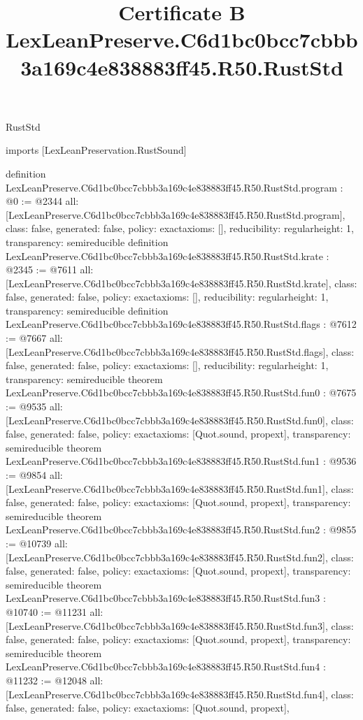 \begin{lexlean}{RustStd}
\title{Certificate B LexLeanPreserve.C6d1bc0bcc7cbbb3a169c4e838883ff45.R50.RustStd}
\begin{coremodule}
imports [LexLeanPreservation.RustSound]

definition LexLeanPreserve.C6d1bc0bcc7cbbb3a169c4e838883ff45.R50.RustStd.program : @0 := @2344 {
  all: [LexLeanPreserve.C6d1bc0bcc7cbbb3a169c4e838883ff45.R50.RustStd.program],
  class: false,
  generated: false,
  policy: exact{axioms: []},
  reducibility: regular{height: 1},
  transparency: semireducible
}
definition LexLeanPreserve.C6d1bc0bcc7cbbb3a169c4e838883ff45.R50.RustStd.krate : @2345 := @7611 {
  all: [LexLeanPreserve.C6d1bc0bcc7cbbb3a169c4e838883ff45.R50.RustStd.krate],
  class: false,
  generated: false,
  policy: exact{axioms: []},
  reducibility: regular{height: 1},
  transparency: semireducible
}
definition LexLeanPreserve.C6d1bc0bcc7cbbb3a169c4e838883ff45.R50.RustStd.flags : @7612 := @7667 {
  all: [LexLeanPreserve.C6d1bc0bcc7cbbb3a169c4e838883ff45.R50.RustStd.flags],
  class: false,
  generated: false,
  policy: exact{axioms: []},
  reducibility: regular{height: 1},
  transparency: semireducible
}
theorem LexLeanPreserve.C6d1bc0bcc7cbbb3a169c4e838883ff45.R50.RustStd.fun0 : @7675 := @9535 {
  all: [LexLeanPreserve.C6d1bc0bcc7cbbb3a169c4e838883ff45.R50.RustStd.fun0],
  class: false,
  generated: false,
  policy: exact{axioms: [Quot.sound, propext]},
  transparency: semireducible
}
theorem LexLeanPreserve.C6d1bc0bcc7cbbb3a169c4e838883ff45.R50.RustStd.fun1 : @9536 := @9854 {
  all: [LexLeanPreserve.C6d1bc0bcc7cbbb3a169c4e838883ff45.R50.RustStd.fun1],
  class: false,
  generated: false,
  policy: exact{axioms: [Quot.sound, propext]},
  transparency: semireducible
}
theorem LexLeanPreserve.C6d1bc0bcc7cbbb3a169c4e838883ff45.R50.RustStd.fun2 : @9855 := @10739 {
  all: [LexLeanPreserve.C6d1bc0bcc7cbbb3a169c4e838883ff45.R50.RustStd.fun2],
  class: false,
  generated: false,
  policy: exact{axioms: [Quot.sound, propext]},
  transparency: semireducible
}
theorem LexLeanPreserve.C6d1bc0bcc7cbbb3a169c4e838883ff45.R50.RustStd.fun3 : @10740 := @11231 {
  all: [LexLeanPreserve.C6d1bc0bcc7cbbb3a169c4e838883ff45.R50.RustStd.fun3],
  class: false,
  generated: false,
  policy: exact{axioms: [Quot.sound, propext]},
  transparency: semireducible
}
theorem LexLeanPreserve.C6d1bc0bcc7cbbb3a169c4e838883ff45.R50.RustStd.fun4 : @11232 := @12048 {
  all: [LexLeanPreserve.C6d1bc0bcc7cbbb3a169c4e838883ff45.R50.RustStd.fun4],
  class: false,
  generated: false,
  policy: exact{axioms: [Quot.sound, propext]},
}
\end{coremodule}
\end{lexlean}
